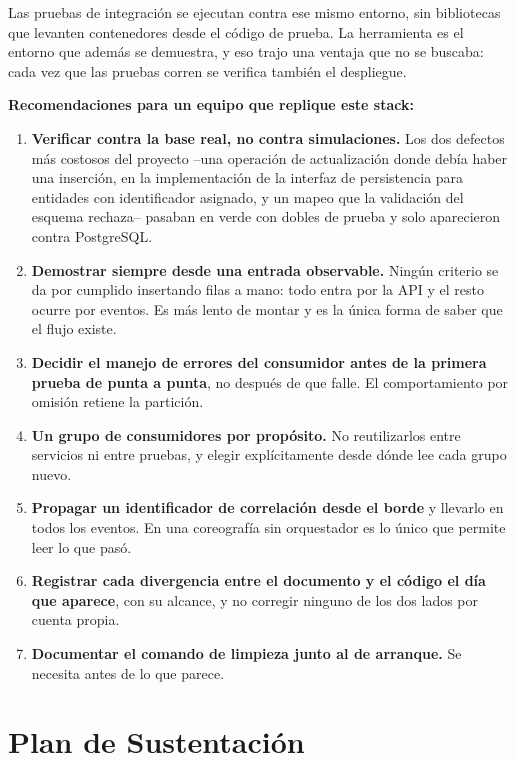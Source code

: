 \documentclass[12pt,a4paper]{article}
\begin{document}
Las pruebas de integración se ejecutan contra ese mismo entorno, sin bibliotecas que levanten contenedores desde el código de prueba. La herramienta es el entorno que además se demuestra, y eso trajo una ventaja que no se buscaba: cada vez que las pruebas corren se verifica también el despliegue.

\textbf{Recomendaciones para un equipo que replique este stack:}

\begin{enumerate}[leftmargin=*]
    \item \textbf{Verificar contra la base real, no contra simulaciones.} Los dos defectos más costosos del proyecto --una operación de actualización donde debía haber una inserción, en la implementación de la interfaz de persistencia para entidades con identificador asignado, y un mapeo que la validación del esquema rechaza-- pasaban en verde con dobles de prueba y solo aparecieron contra PostgreSQL.
    \item \textbf{Demostrar siempre desde una entrada observable.} Ningún criterio se da por cumplido insertando filas a mano: todo entra por la API y el resto ocurre por eventos. Es más lento de montar y es la única forma de saber que el flujo existe.
    \item \textbf{Decidir el manejo de errores del consumidor antes de la primera prueba de punta a punta}, no después de que falle. El comportamiento por omisión retiene la partición.
    \item \textbf{Un grupo de consumidores por propósito.} No reutilizarlos entre servicios ni entre pruebas, y elegir explícitamente desde dónde lee cada grupo nuevo.
    \item \textbf{Propagar un identificador de correlación desde el borde} y llevarlo en todos los eventos. En una coreografía sin orquestador es lo único que permite leer lo que pasó.
    \item \textbf{Registrar cada divergencia entre el documento y el código el día que aparece}, con su alcance, y no corregir ninguno de los dos lados por cuenta propia.
    \item \textbf{Documentar el comando de limpieza junto al de arranque.} Se necesita antes de lo que parece.
\end{enumerate}

\section{Plan de Sustentación}
\end{document}
